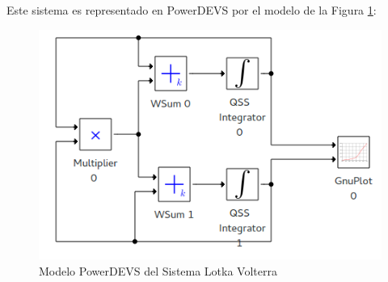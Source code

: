 	Este sistema es representado en PowerDEVS por el modelo de la Figura \ref{model:lotka_volterra}:

\begin{figure}[H]
\includegraphics[width=0.75\linewidth]{lotka_volterra_pwd}
\caption{Modelo PowerDEVS del Sistema Lotka Volterra}
\label{model:lotka_volterra}
\end{figure}

